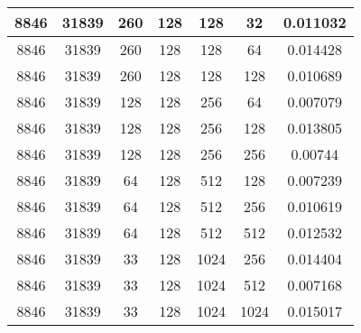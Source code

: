 \documentclass[9pt]{article}
\begin{document}
\begin{tabular}{|c|c|c|c|c|c|c| }
\hline
8846  & 31839  & 260  & 128  & 128  & 32  & 0.011032 \\
\hline
8846  & 31839  & 260  & 128  & 128  & 64  & 0.014428 \\
\hline
8846  & 31839  & 260  & 128  & 128  & 128  & 0.010689 \\
\hline
8846  & 31839  & 128  & 128  & 256  & 64  & 0.007079 \\
\hline
8846  & 31839  & 128  & 128  & 256  & 128  & 0.013805 \\
\hline
8846  & 31839  & 128  & 128  & 256  & 256  & 0.00744 \\
\hline
8846  & 31839  & 64  & 128  & 512  & 128  & 0.007239 \\
\hline
8846  & 31839  & 64  & 128  & 512  & 256  & 0.010619 \\
\hline
8846  & 31839  & 64  & 128  & 512  & 512  & 0.012532 \\
\hline
8846  & 31839  & 33  & 128  & 1024  & 256  & 0.014404 \\
\hline
8846  & 31839  & 33  & 128  & 1024  & 512  & 0.007168 \\
\hline
8846  & 31839  & 33  & 128  & 1024  & 1024  & 0.015017 \\
\hline
\end{tabular}
 
\end{document}
